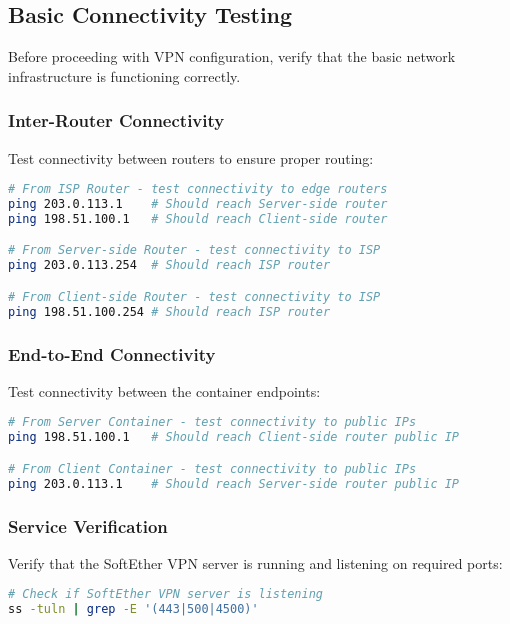 \subsection{Basic Connectivity Testing}

Before proceeding with VPN configuration, verify that the basic network infrastructure is functioning correctly.

\subsubsection{Inter-Router Connectivity}

Test connectivity between routers to ensure proper routing:

\begin{lstlisting}[language=bash]
# From ISP Router - test connectivity to edge routers
ping 203.0.113.1    # Should reach Server-side router
ping 198.51.100.1   # Should reach Client-side router

# From Server-side Router - test connectivity to ISP
ping 203.0.113.254  # Should reach ISP router

# From Client-side Router - test connectivity to ISP  
ping 198.51.100.254 # Should reach ISP router
\end{lstlisting}

\subsubsection{End-to-End Connectivity}

Test connectivity between the container endpoints:

\begin{lstlisting}[language=bash]
# From Server Container - test connectivity to public IPs
ping 198.51.100.1   # Should reach Client-side router public IP

# From Client Container - test connectivity to public IPs
ping 203.0.113.1    # Should reach Server-side router public IP
\end{lstlisting}

\subsubsection{Service Verification}

Verify that the SoftEther VPN server is running and listening on required ports:

\begin{lstlisting}[language=bash]
# Check if SoftEther VPN server is listening
ss -tuln | grep -E '(443|500|4500)'

\end{lstlisting}

